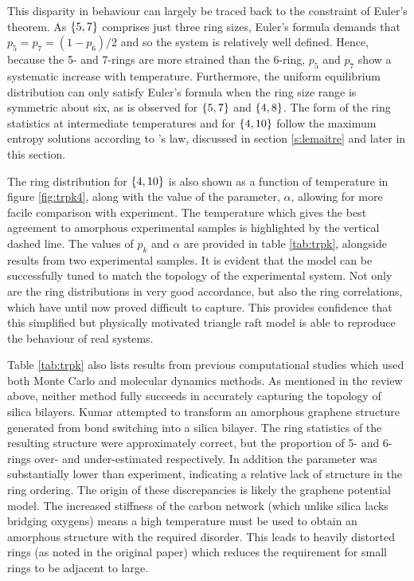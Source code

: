 This disparity in behaviour can largely be traced back to the constraint of Euler's theorem. 
As $\left\{5,7\right\}$ comprises just three ring sizes, Euler's formula demands that $p_5=p_7=\left(1-p_6\right)/2$ and so the system is relatively well defined. 
Hence, because the 5\-- and 7\--rings are more strained than the 6\--ring, $p_5$ and $p_7$ show a systematic increase with temperature. 
Furthermore, the uniform equilibrium distribution can only satisfy Euler's formula when the ring size range is symmetric about six, as is observed for $\left\{5,7\right\}$ and $\left\{4,8\right\}$. 
The form of the ring statistics at intermediate temperatures and for $\left\{4,10\right\}$ follow the maximum entropy solutions according to \lm's law, discussed in section \ref{s:lemaitre} and later in this section.

The ring distribution for $\left\{4,10\right\}$ is also shown as a function of temperature in figure \ref{fig:trpk4}, along with the value of the \aw{} parameter, $\alpha$, allowing for more facile comparison with experiment. 
The temperature which gives the best agreement to amorphous experimental samples is highlighted by the vertical dashed line. 
The values of $p_k$ and $\alpha$ are provided in table \ref{tab:trpk}, alongside results from two experimental samples. 
It is evident that the model can be successfully tuned to match the topology of the experimental system. 
Not only are the ring distributions in very good accordance, but also the ring correlations, which have until now proved difficult to capture. 
This provides confidence that this simplified but physically motivated triangle raft model is able to reproduce the behaviour of real systems.

Table \ref{tab:trpk} also lists results from previous computational studies which used both Monte Carlo and molecular dynamics methods. 
As mentioned in the review above, neither method fully succeeds in accurately capturing the topology of silica bilayers.
Kumar \etal{} attempted to transform an amorphous graphene structure generated from bond switching \mc{} into a silica bilayer.
The ring statistics of the resulting structure were approximately correct, but the proportion of 5\-- and 6\-- rings over\-- and under\--estimated respectively.
In addition the \aw{} parameter was substantially lower than experiment, indicating a relative lack of structure in the ring ordering.
The origin of these discrepancies is likely the graphene potential model.
The increased stiffness of the carbon network (which unlike silica lacks bridging oxygens) means a high temperature must be used to obtain an amorphous structure with the required disorder.
This leads to heavily distorted rings (as noted in the original paper) which reduces the requirement for small rings to be adjacent to large.


